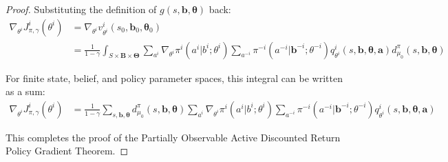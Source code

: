 \begin{proof}
    Substituting the definition of $g(s, \boldsymbol{b}, \boldsymbol{\theta})$ back:
    \begin{align}
        \nabla_{\theta^i}J^{i}_{\pi, \gamma}(\theta^{i}) & = \nabla_{\theta^i}v^{i}_{\theta^i}(s_{0}, \boldsymbol{b}_{0}, \boldsymbol{\theta}_{0})                                                                                                                                                                                                                                                  \\
                                                         & = \frac{1}{1-\gamma}\int_{S \times \boldsymbol{B} \times \boldsymbol{\Theta}}\sum_{a^i}\nabla_{\theta^i}\pi^{i}(a^{i}|b^{i}; \theta^{i}) \sum_{a^{-i}}\pi^{-i}(a^{-i}|\boldsymbol{b}^{-i}; \theta^{-i}) q^{i}_{\theta^i}(s, \boldsymbol{b}, \boldsymbol{\theta}, \boldsymbol{a}) d^{\pi}_{\mu_0}(s, \boldsymbol{b}, \boldsymbol{\theta})
    \end{align}

    For finite state, belief, and policy parameter spaces, this integral can be
    written as a sum:
    \begin{align}
        \nabla_{\theta^i}J^{i}_{\pi, \gamma}(\theta^{i}) & = \frac{1}{1-\gamma}\sum_{s, \boldsymbol{b}, \boldsymbol{\theta}}d^{\pi}_{\mu_0}(s, \boldsymbol{b}, \boldsymbol{\theta}) \sum_{a^i}\nabla_{\theta^i}\pi^{i}(a^{i}|b^{i}; \theta^{i}) \sum_{a^{-i}}\pi^{-i}(a^{-i}|\boldsymbol{b}^{-i}; \theta^{-i}) q^{i}_{\theta^i}(s, \boldsymbol{b}, \boldsymbol{\theta}, \boldsymbol{a})
    \end{align}

    This completes the proof of the Partially Observable Active Discounted Return
    Policy Gradient Theorem.
\end{proof}

